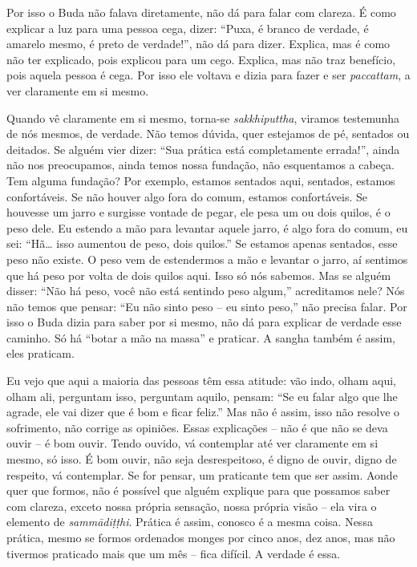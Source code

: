 Por isso o Buda não falava diretamente, não dá para falar com
clareza. É como explicar a luz para uma pessoa cega, dizer: “Puxa, é
branco de verdade, é amarelo mesmo, é preto de verdade!”, não dá para
dizer. Explica, mas é como não ter explicado, pois explicou para um
cego. Explica, mas não traz benefício, pois aquela pessoa é cega. Por
isso ele voltava e dizia para fazer e ser \textit{paccattam}, a ver
claramente em si mesmo. 

Quando vê claramente em si mesmo, torna-se \textit{sakkhiputtha},
viramos testemunha de nós mesmos, de verdade. Não temos dúvida, quer
estejamos de pé, sentados ou deitados. Se alguém vier dizer: “Sua
prática está completamente errada!”, ainda não nos preocupamos, ainda
temos nossa fundação, não esquentamos a cabeça. Tem alguma fundação?
Por exemplo, estamos sentados aqui, sentados, estamos confortáveis. Se
não houver algo fora do comum, estamos confortáveis. Se houvesse um
jarro e surgisse vontade de pegar, ele pesa um ou dois quilos, é o peso
dele. Eu estendo a mão para levantar aquele jarro, é algo fora do
comum, eu sei: “Hã\ldots{} isso aumentou de peso, dois quilos.” Se estamos
apenas sentados, esse peso não existe. O peso vem de estendermos a mão
e levantar o jarro, aí sentimos que há peso por volta de dois quilos
aqui. Isso só nós sabemos. Mas se alguém disser: “Não há peso, você não
está sentindo peso algum,” acreditamos nele? Nós não temos que pensar:
“Eu não sinto peso – eu sinto peso,” não precisa falar. Por isso o Buda
dizia para saber por si mesmo, não dá para explicar de verdade esse
caminho. Só há “botar a mão na massa” e praticar. A sangha também é
assim, eles praticam.

Eu vejo que aqui a maioria das pessoas têm essa atitude: vão indo,
olham aqui, olham ali, perguntam isso, perguntam aquilo, pensam: “Se eu
falar algo que lhe agrade, ele vai dizer que é bom e ficar feliz.” Mas
não é assim, isso não resolve o sofrimento, não corrige as opiniões.
Essas explicações – não é que não se deva ouvir – é bom ouvir. Tendo
ouvido, vá contemplar até ver claramente em si mesmo, só isso. É bom
ouvir, não seja desrespeitoso, é digno de ouvir, digno de respeito, vá
contemplar. Se for pensar, um praticante tem que ser assim. Aonde quer
que formos, não é possível que alguém explique para que possamos saber
com clareza, exceto nossa própria sensação, nossa própria visão – ela
vira o elemento de \textit{sammādiṭṭhi}. Prática é assim, conosco é a
mesma coisa. Nessa prática, mesmo se formos ordenados monges por cinco
anos, dez anos, mas não tivermos praticado mais que um mês – fica
difícil. A verdade é essa. 

